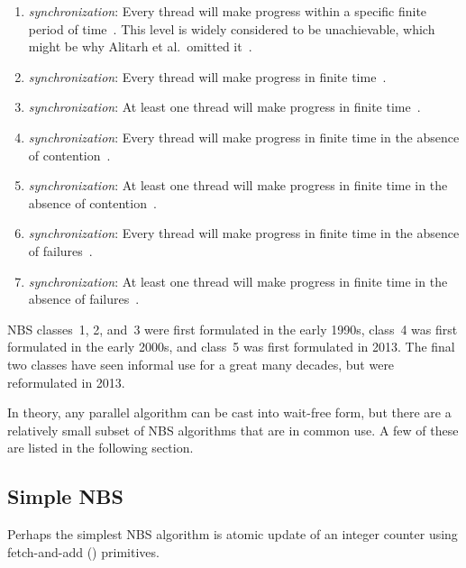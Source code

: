 \begin{enumerate}
\item	\emph{ synchronization}:
	Every thread will make progress within
	a specific finite period of time~\cite{Herlihy91}.
	This level is widely considered to be unachievable, which might be why
	Alitarh et al.\ omitted it~\cite{DanAlitarh2013PracticalProgress}.
\item	\emph{ synchronization}:
	Every thread will make progress
	in finite time~\cite{Herlihy93}.
\item	\emph{ synchronization}:
	At least one thread will
	make progress in finite time~\cite{Herlihy93}.
\item	\emph{ synchronization}:
	Every thread will make progress in finite time in the absence of
	contention~\cite{HerlihyLM03}.
\item	\emph{ synchronization}:
	At least one thread will make progress in finite time in the absence of
	contention~\cite{DanAlitarh2013PracticalProgress}.
\item	\emph{ synchronization}:
	Every thread will make progress in finite time in the absence of
	failures~\cite{DanAlitarh2013PracticalProgress}.
\item	\emph{ synchronization}:
	At least one thread will make progress in finite time in the absence of
	failures~\cite{DanAlitarh2013PracticalProgress}.
\end{enumerate}

NBS classes~1, 2, and~3 were first formulated in the early 1990s,
class~4 was first formulated in the early 2000s,
and class~5 was first formulated in 2013.
The final two classes have seen informal use for a great many decades,
but were reformulated in 2013.

In theory, any parallel algorithm can be cast into wait-free form,
but there are a relatively small subset of NBS algorithms that are
in common use.
A few of these are listed in the following section.

\subsection{Simple NBS}
\label{sec:advsync:Simple NBS}

Perhaps the simplest NBS algorithm is atomic update of an integer
counter using fetch-and-add () primitives.

